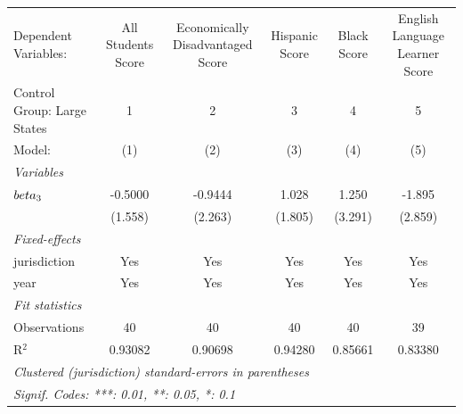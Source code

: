 
\begingroup
\centering
\begin{tabular}{lccccc}
   \tabularnewline \midrule \midrule
   Dependent Variables:        & All Students Score & Economically Disadvantaged Score & Hispanic Score & Black Score & English Language Learner Score\\  
   Control Group: Large States & 1                  & 2                                & 3              & 4           & 5 \\   
   Model:                      & (1)                & (2)                              & (3)            & (4)         & (5)\\  
   \midrule
   \emph{Variables}\\
   $\\beta_3$                  & -0.5000            & -0.9444                          & 1.028          & 1.250       & -1.895\\   
                               & (1.558)            & (2.263)                          & (1.805)        & (3.291)     & (2.859)\\   
   \midrule
   \emph{Fixed-effects}\\
   jurisdiction                & Yes                & Yes                              & Yes            & Yes         & Yes\\  
   year                        & Yes                & Yes                              & Yes            & Yes         & Yes\\  
   \midrule
   \emph{Fit statistics}\\
   Observations                & 40                 & 40                               & 40             & 40          & 39\\  
   R$^2$                       & 0.93082            & 0.90698                          & 0.94280        & 0.85661     & 0.83380\\  
   \midrule \midrule
   \multicolumn{6}{l}{\emph{Clustered (jurisdiction) standard-errors in parentheses}}\\
   \multicolumn{6}{l}{\emph{Signif. Codes: ***: 0.01, **: 0.05, *: 0.1}}\\
\end{tabular}
\par\endgroup


